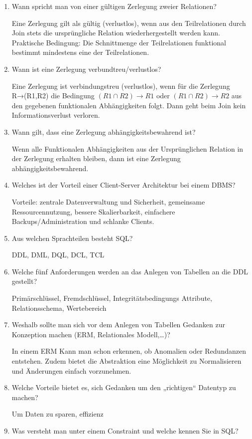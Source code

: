 \documentclass[a4paper]{article}
\begin{document}
\begin{enumerate}
    Wenn die linke Seite (Determinate) immer ein Superschlüssel ist (Erweiterung von 3NF)
    \item Wann spricht man von einer gültigen Zerlegung zweier Relationen?
    
    Eine Zerlegung gilt als gültig (verlustlos), wenn aus den Teilrelationen durch Join stets die ursprüngliche Relation wiederhergestellt werden kann. Praktische Bedingung: Die Schnittmenge der Teilrelationen funktional bestimmt mindestens eine der Teilrelationen.
    \item Wann ist eine Zerlegung verbundtreu/verlustlos?
    
    Eine Zerlegung ist verbindungstreu (verlustlos), wenn für die Zerlegung R→(R1,R2) die Bedingung $(R1 \cap R2) \to R1$ oder $(R1 \cap R2) \to R2$ aus den gegebenen funktionalen Abhängigkeiten folgt. Dann geht beim Join kein Informationsverlust verloren.
    \item Wann gilt, dass eine Zerlegung abhängigkeitsbewahrend ist?
    
    Wenn alle Funktionalen Abhängigkeiten aus der Ursprünglichen Relation in der Zerlegung erhalten bleiben, dann ist eine Zerlegung abhängigkeitsbewahrend. 
    \item Welches ist der Vorteil einer Client-Server Architektur bei einem DBMS?
    
    Vorteile: zentrale Datenverwaltung und Sicherheit, gemeinsame Ressourcennutzung, bessere Skalierbarkeit, einfachere Backups/Administration und schlanke Clients.
    \item Aus welchen Sprachteilen besteht SQL?
    
    DDL, DML, DQL, DCL, TCL
    \item Welche fünf Anforderungen werden an das Anlegen von Tabellen an die DDL gestellt?
    
    Primärschlüssel, Fremdschlüssel, Integritätsbedingungs Attribute, Relationsschema, Wertebereich
    \item Weshalb sollte man sich vor dem Anlegen von Tabellen Gedanken zur Konzeption machen (ERM, Relationales Modell,…)?
    
    In einem ERM Kann man schon erkennen, ob Anomalien oder Redundanzen entstehen. Zudem bietet die Abstraktion eine Möglichkeit zu Normalisieren und Änderungen einfach vorzunehmen.
    \item Welche Vorteile bietet es, sich Gedanken um den „richtigen“ Datentyp zu machen?
    
    Um Daten zu sparen, effizienz
    \item Was versteht man unter einem Constraint und welche kennen Sie in SQL?
    

\end{enumerate}
\end{document}
